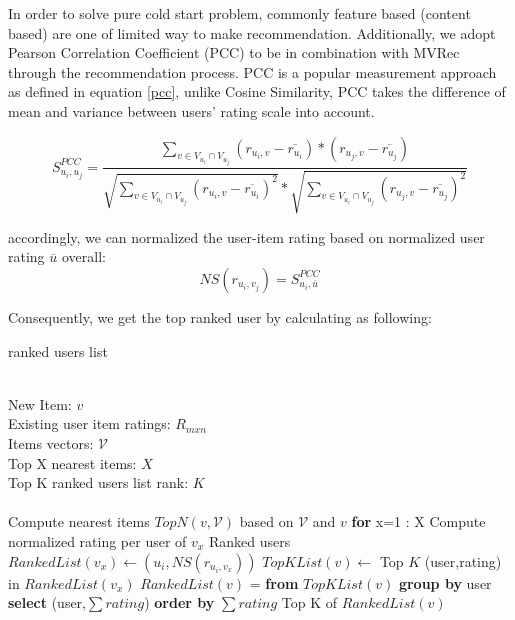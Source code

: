 In order to solve pure cold start problem, commonly feature based (content based) are one of limited way to make recommendation. 
Additionally, we adopt Pearson Correlation Coefficient (PCC) to be in combination with MVRec through the recommendation process. 
PCC is a popular measurement approach as defined in equation \ref{pcc}, unlike Cosine Similarity, PCC takes the difference of mean and variance between users' rating scale into account.

\begin{strip}
    \begin{equation}\label{pcc}
        S_{u_i,u_j}^{PCC} = 
        \dfrac{
            \sum_{v \in V_{u_i} \cap V_{u_j}} (r_{u_i,v}-\overline{r_{u_i}}) 
            * 
            (r_{u_j,v} - \overline{r_{u_j}})
        }
        {
            \sqrt{\sum_{v \in V_{u_i} \cap V_{u_j}} (r_{u_i,v}-\overline{r_{u_i}})^2} 
            * 
            \sqrt{\sum_{v \in V_{u_i} \cap V_{u_j}} (r_{u_j,v}-\overline{r_{u_j}})^2}
        }
    \end{equation}
\end{strip}

accordingly, we can normalized the user-item rating based on normalized user rating $\overline{u}$ overall:
\begin{equation}\label{pcc}
    NS(r_{u_i,v_j}) =  S_{u_i,\overline{u}}^{PCC}
\end{equation}

Consequently, we get the top ranked user by calculating as following:

\begin{algorithm}
    \caption{ranked users list}
    \begin{algorithmic}[1] 
    \REQUIRE~~\\ %
    New Item: $v$\\
    Existing user item ratings: ${R_{mxn}}$\\
    Items vectors: $\mathcal{V}$\\
    Top X nearest items: $X$\\
    Top K ranked users list rank: $K$\\
    \ENSURE~~\\ %
    \STATE Compute nearest items $TopN(v,\mathcal{V})$ based on $\mathcal{V}$ and $v$
    \STATE \textbf{for} x=1 : X
    \STATE \quad Compute normalized rating per user of $v_x$
    \STATE \quad Ranked users $RankedList(v_x) \leftarrow (u_i, NS(r_{u_i,v_x}))$
    \STATE \quad $TopKList(v) \leftarrow$ Top $K$ (user,rating) in $RankedList(v_x)$
    \STATE $RankedList(v)$ = \textbf{from} $TopKList(v)$ \textbf{group by} user \textbf{select} (user,$\sum{rating}$) \textbf{order by} $\sum{rating}$
    \RETURN Top K of $RankedList(v)$
    \end{algorithmic}\label{alg:1}
\end{algorithm}

